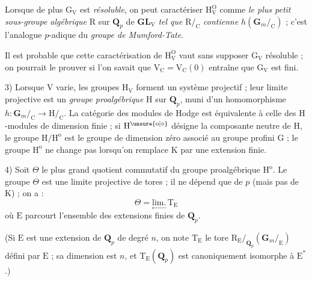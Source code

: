 Lorsque de plus $\mathrm{G}_{\mathrm{V}}$ est \textit{résoluble}, on peut caractériser $\mathrm{H}_{\mathrm{V}}^{\mathrm{O}}$ comme \textit{le plus petit sous-groupe algébrique} $\mathrm{R}$ sur $\mathbf{Q}_p$ de $\mathbf{GL}_{\mathrm{V}}$ \textit{tel que} $\mathrm{R}/_{\mathrm{C}}$ \textit{contienne} $h(\mathbf{G}_m/_{\mathrm{C}})$ ; c’est l’analogue $p$-adique du \textit{groupe de Mumford-Tate}.

Il est probable que cette caractérisation de $\mathrm{H}_{\mathrm{V}}^{\mathrm{O}}$ vaut sans supposer $\mathrm{G}_{\mathrm{V}}$ résoluble ; on pourrait le prouver si l’on savait que $\mathrm{V}_{\mathrm{C}}=\mathrm{V}_{\mathrm{C}}(0)$ entraîne que $\mathrm{G}_{\mathrm{V}}$ est fini.
\reversemarginpar
\margin{\handwritten{\shortstack[l]{ceci a été\\démontré par\\S. Sen (Annals)}\,$\left[\vphantom{\begin{matrix}1\\1\\1\end{matrix}}\right.$}}
\normalmarginpar

3) Lorsque $\mathrm{V}$ varie, les groupes $\mathrm{H}_{\mathrm{V}}$ forment un système projectif ; leur limite projective est un \textit{groupe proalgébrique} $\mathrm{H}$ sur $\mathbf{Q}_p$, muni d’un homomorphisme $h:\mathbf{G}_m/_{\mathrm{C}}\longrightarrow\mathrm{H}/_{\mathrm{C}}$. La catégorie des modules de Hodge est équivalente à celle des $\mathrm{H}$-modules de dimension finie ; si $\mathrm{H}^{\unsure{\mathrm{o}|\circ}}$ désigne la composante neutre de $\mathrm{H}$, le groupe $\mathrm{H}/\mathrm{H}^{\mathrm{o}}$ est le groupe de dimension zéro associé au groupe profini $\mathrm{G}$ ; le groupe $\mathrm{H}^{\mathrm{o}}$ ne change pas lorsqu’on remplace $\mathrm{K}$ par une extension finie.

4) Soit $\Theta$ le plus grand quotient commutatif du groupe proalgébrique $\mathrm{H}^{\mathrm{o}}$. Le groupe $\Theta$ est une limite projective de tores ; il ne dépend que de $p$ (mais pas de $\mathrm{K}$) ; on a :
\[
\Theta=\underset{\leftarrow}{\mathrm{lim.}}\,\mathrm{T}_{\mathrm{E}}
\]
où $\mathrm{E}$ parcourt l’ensemble des extensions finies de $\mathbf{Q}_p$.

(Si $\mathrm{E}$ est une extension de $\mathbf{Q}_p$ de degré $n$, on note $\mathrm{T}_{\mathrm{E}}$ le tore $\mathrm{R}_{\mathrm{E}}/_{\mathbf{Q}_p}(\mathbf{G}_m/_{\mathrm{E}})$ défini par $\mathrm{E}$ ; sa dimension est $n$, et $\mathrm{T}_{\mathrm{E}}(\mathbf{Q}_p)$ est canoniquement isomorphe à $\mathrm{E}^{*}$.)

